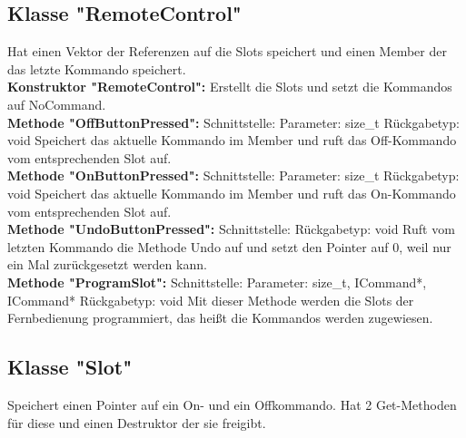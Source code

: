 \documentclass[12pt,a4paper]{article}
\begin{document}
\subsection {Klasse "RemoteControl"}
Hat einen Vektor der Referenzen auf die Slots speichert und einen Member der das letzte Kommando speichert.
\\

\textbf {Konstruktor "RemoteControl": } 
\newline
Erstellt die Slots und setzt die Kommandos auf NoCommand.
\\

\textbf {Methode "OffButtonPressed": } 
\newline
Schnittstelle:
\newline
Parameter: size\_t
\newline
Rückgabetyp: void
\newline
Speichert das aktuelle Kommando im Member und ruft das Off-Kommando vom entsprechenden Slot auf.
\\

\textbf {Methode "OnButtonPressed": } 
\newline
Schnittstelle:
\newline
Parameter: size\_t
\newline
Rückgabetyp: void
\newline
Speichert das aktuelle Kommando im Member und ruft das On-Kommando vom entsprechenden Slot auf.
\\

\textbf {Methode "UndoButtonPressed": } 
\newline
Schnittstelle:
\newline
Rückgabetyp: void
\newline
Ruft vom letzten Kommando die Methode Undo auf und setzt den Pointer auf 0, weil nur ein Mal zurückgesetzt werden kann.
\\

\textbf {Methode "ProgramSlot": } 
\newline
Schnittstelle:
\newline
Parameter: size\_t, ICommand*, ICommand*
\newline
Rückgabetyp: void
\newline
Mit dieser Methode werden die Slots der Fernbedienung programmiert, das heißt die Kommandos werden zugewiesen.
\\

\subsection {Klasse "Slot"}
Speichert einen Pointer auf ein On- und ein Offkommando. Hat 2 Get-Methoden für diese und einen Destruktor der sie freigibt.
\\
\end{document}

